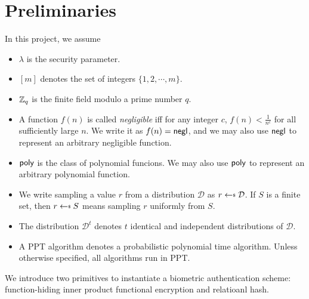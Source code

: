 \section{Preliminaries}
\label{sec:preliminaries}

In this project, we assume

\begin{itemize}
	
	\item $\lambda$ is the security parameter.

	\item $[m]$ denotes the set of integers $\{1, 2, \cdots, m\}$.

	\item $\mathbb{Z}_q$ is the finite field modulo a prime number $q$.

	\item A function $f(n)$ is called \emph{negligible} iff for any integer $c$, $f(n) < \frac{1}{n^c}$ for all sufficiently large $n$. We write it as $f(n) = \mathsf{negl}$, and we may also use $\mathsf{negl}$ to represent an arbitrary negligible function.
	
	\item $\mathsf{poly}$ is the class of polynomial funcions. We may also use $\mathsf{poly}$ to represent an arbitrary polynomial function.
	
	\item We write sampling a value $r$ from a distribution $\mathcal{D}$ as $r \getsdollar \mathcal{D}$. If $S$ is a finite set, then $r \getsdollar S$ means sampling $r$ uniformly from $S$.

	\item The distribution $\mathcal{D}^t$ denotes $t$ identical and independent distributions of $\mathcal{D}$.

	\item A PPT algorithm denotes a probabilistic polynomial time algorithm. Unless otherwise specified, all algorithms run in PPT.

\end{itemize}


We introduce two primitives to instantiate a biometric authentication scheme: function-hiding inner product functional encryption and relatioanl hash.

